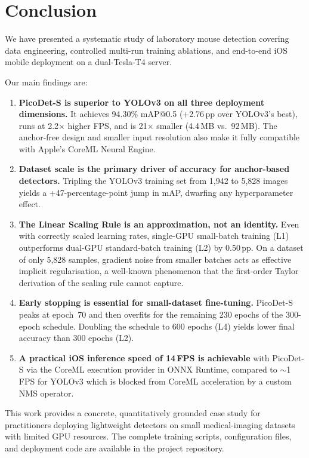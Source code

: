 \section{Conclusion}
\label{sec:conclusion}

We have presented a systematic study of laboratory mouse detection
covering data engineering, controlled multi-run training ablations,
and end-to-end iOS mobile deployment on a dual-Tesla-T4 server.

Our main findings are:

\begin{enumerate}[leftmargin=1.5em]
  \item \textbf{PicoDet-S is superior to YOLOv3 on all three deployment
    dimensions.}  It achieves 94.30\% mAP@0.5 (+2.76\,pp over YOLOv3's
    best), runs at 2.2$\times$ higher FPS, and is 21$\times$ smaller
    (4.4\,MB vs.\ 92\,MB).  The anchor-free design and smaller input
    resolution also make it fully compatible with Apple's CoreML
    Neural Engine.

  \item \textbf{Dataset scale is the primary driver of accuracy for
    anchor-based detectors.}  Tripling the YOLOv3 training set from
    1,942 to 5,828 images yields a +47-percentage-point jump in mAP,
    dwarfing any hyperparameter effect.

  \item \textbf{The Linear Scaling Rule is an approximation, not an
    identity.}  Even with correctly scaled learning rates, single-GPU
    small-batch training (L1) outperforms dual-GPU standard-batch
    training (L2) by 0.50\,pp.  On a dataset of only 5,828 samples,
    gradient noise from smaller batches acts as effective implicit
    regularisation, a well-known phenomenon that the first-order Taylor
    derivation of the scaling rule cannot capture.

  \item \textbf{Early stopping is essential for small-dataset
    fine-tuning.}  PicoDet-S peaks at epoch~70 and then overfits for
    the remaining 230 epochs of the 300-epoch schedule.  Doubling the
    schedule to 600 epochs (L4) yields lower final accuracy than 300
    epochs (L2).

  \item \textbf{A practical iOS inference speed of 14\,FPS is achievable}
    with PicoDet-S via the CoreML execution provider in ONNX Runtime,
    compared to $\sim$1\,FPS for YOLOv3 which is blocked from CoreML
    acceleration by a custom NMS operator.
\end{enumerate}

This work provides a concrete, quantitatively grounded case study for
practitioners deploying lightweight detectors on small medical-imaging
datasets with limited GPU resources.  The complete training scripts,
configuration files, and deployment code are available in the
project repository.
